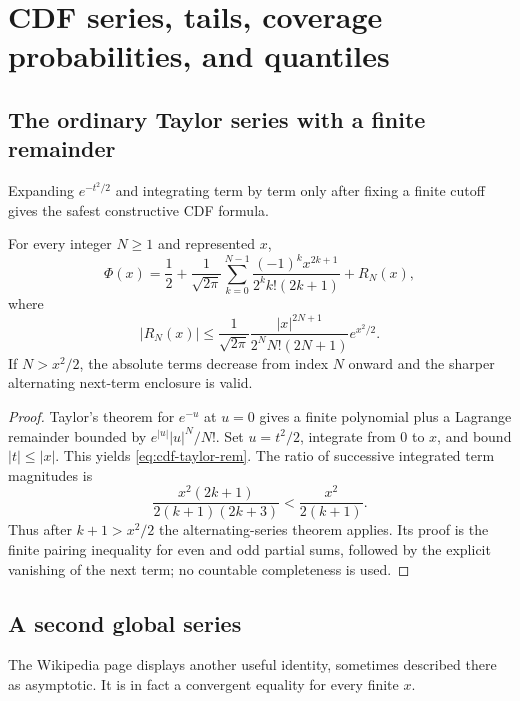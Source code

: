 \section{CDF series, tails, coverage probabilities, and quantiles}\label{sec:cdf-tails}

\subsection{The ordinary Taylor series with a finite remainder}

Expanding $e^{-t^2/2}$ and integrating term by term only after fixing a finite cutoff gives the safest constructive CDF formula.

\begin{theorem}\label{thm:cdf-taylor}
For every integer $N\ge1$ and represented $x$,
\begin{equation}\label{eq:cdf-taylor}
 \Phi(x)=\frac12+\frac1{\sqrt{2\pi}}
  \sum_{k=0}^{N-1}\frac{(-1)^k x^{2k+1}}{2^k k!(2k+1)}+R_N(x),
\end{equation}
where
\begin{equation}\label{eq:cdf-taylor-rem}
 |R_N(x)|\le
 \frac1{\sqrt{2\pi}}
 \frac{|x|^{2N+1}}{2^N N!(2N+1)}e^{x^2/2}.
\end{equation}
If $N>x^2/2$, the absolute terms decrease from index $N$ onward and the sharper alternating next-term enclosure is valid.
\end{theorem}

\begin{proof}
Taylor's theorem for $e^{-u}$ at $u=0$ gives a finite polynomial plus a Lagrange remainder bounded by $e^{|u|}|u|^N/N!$.  Set $u=t^2/2$, integrate from $0$ to $x$, and bound $|t|\le|x|$.  This yields \eqref{eq:cdf-taylor-rem}.  The ratio of successive integrated term magnitudes is
\[
 \frac{x^2(2k+1)}{2(k+1)(2k+3)}<\frac{x^2}{2(k+1)}.
\]
Thus after $k+1>x^2/2$ the alternating-series theorem applies.  Its proof is the finite pairing inequality for even and odd partial sums, followed by the explicit vanishing of the next term; no countable completeness is used.
\end{proof}

\subsection{A second global series}

The Wikipedia page displays another useful identity, sometimes described there as asymptotic.  It is in fact a convergent equality for every finite $x$.

